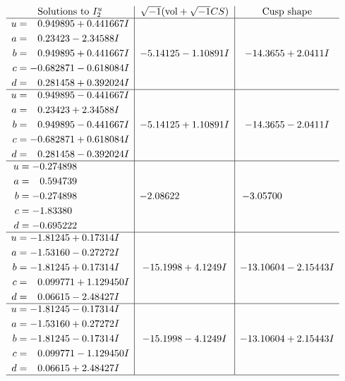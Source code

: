\documentclass[1p]{elsarticle_modified}
\theoremstyle{definition}
\newcommand{\I}{\sqrt{-1}}
\begin{document}
$$\begin{array}{c|c|c}  
\text{Solutions to }I^u_{2}& \I (\text{vol} + \sqrt{-1}CS) & \text{Cusp shape}\\
 \hline 
\begin{aligned}
u &= \phantom{-}0.949895 + 0.441667 I \\
a &= \phantom{-}0.23423 - 2.34588 I \\
b &= \phantom{-}0.949895 + 0.441667 I \\
c &= -0.682871 - 0.618084 I \\
d &= \phantom{-}0.281458 + 0.392024 I\end{aligned}
 & -5.14125 - 1.10891 I & -14.3655 + 2.0411 I \\ \hline\begin{aligned}
u &= \phantom{-}0.949895 - 0.441667 I \\
a &= \phantom{-}0.23423 + 2.34588 I \\
b &= \phantom{-}0.949895 - 0.441667 I \\
c &= -0.682871 + 0.618084 I \\
d &= \phantom{-}0.281458 - 0.392024 I\end{aligned}
 & -5.14125 + 1.10891 I & -14.3655 - 2.0411 I \\ \hline\begin{aligned}
u &= -0.274898\phantom{ +0.000000I} \\
a &= \phantom{-}0.594739\phantom{ +0.000000I} \\
b &= -0.274898\phantom{ +0.000000I} \\
c &= -1.83380\phantom{ +0.000000I} \\
d &= -0.695222\phantom{ +0.000000I}\end{aligned}
 & -2.08622\phantom{ +0.000000I} & -3.05700\phantom{ +0.000000I} \\ \hline\begin{aligned}
u &= -1.81245 + 0.17314 I \\
a &= -1.53160 - 0.27272 I \\
b &= -1.81245 + 0.17314 I \\
c &= \phantom{-}0.099771 + 1.129450 I \\
d &= \phantom{-}0.06615 - 2.48427 I\end{aligned}
 & -15.1998 + 4.1249 I & -13.10604 - 2.15443 I \\ \hline\begin{aligned}
u &= -1.81245 - 0.17314 I \\
a &= -1.53160 + 0.27272 I \\
b &= -1.81245 - 0.17314 I \\
c &= \phantom{-}0.099771 - 1.129450 I \\
d &= \phantom{-}0.06615 + 2.48427 I\end{aligned}
 & -15.1998 - 4.1249 I & -13.10604 + 2.15443 I\\
 \hline 
 \end{array}$$\newpage\newpage\renewcommand{\arraystretch}{1}
\end{document}
